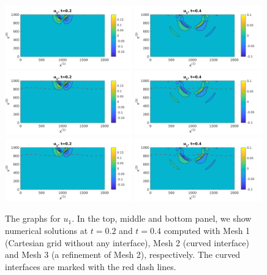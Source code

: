 \begin{figure}[htbp]
	\centering
	\includegraphics[width=0.49\textwidth,trim={0.05cm 0.1cm 0.55cm 0.45cm}, clip]{u1_t02_cartesian.png}
	\includegraphics[width=0.49\textwidth,trim={0.05cm 0.1cm 0.55cm 0.45cm}, clip]{u1_t04_cartesian.png}\\
	\includegraphics[width=0.49\textwidth,trim={0.05cm 0.1cm 0.55cm 0.45cm}, clip]{u1_t02_curvi.png}
	\includegraphics[width=0.49\textwidth,trim={0.05cm 0.1cm 0.55cm 0.45cm}, clip]{u1_t04_curvi.png}\\
	\includegraphics[width=0.49\textwidth,trim={0.05cm 0.1cm 0.55cm 0.45cm}, clip]{u1_t02_curvi_finer.png}
	\includegraphics[width=0.49\textwidth,trim={0.05cm 0.1cm 0.55cm 0.45cm}, clip]{u1_t04_curvi_finer.png}
\caption{The graphs for $u_1$. In the top, middle and bottom panel, we show numerical solutions at $t=0.2$ and $t=0.4$ computed with Mesh 1 (Cartesian grid without any interface), Mesh 2 (curved interface) and Mesh 3 (a refinement of Mesh 2), respectively. The curved interfaces are marked with the red dash lines.}
\label{u1}
\end{figure}

